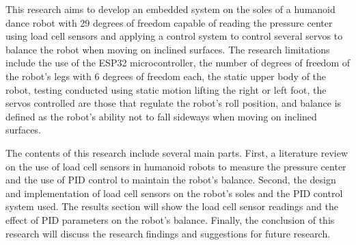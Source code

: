 This research aims to develop an embedded system on the soles of a humanoid dance robot with 29 degrees of freedom capable of reading the pressure center using load cell sensors and applying a control system to control several servos to balance the robot when moving on inclined surfaces. The research limitations include the use of the ESP32 microcontroller, the number of degrees of freedom of the robot's legs with 6 degrees of freedom each, the static upper body of the robot, testing conducted using static motion lifting the right or left foot, the servos controlled are those that regulate the robot's roll position, and balance is defined as the robot's ability not to fall sideways when moving on inclined surfaces.

The contents of this research include several main parts. First, a literature review on the use of load cell sensors in humanoid robots to measure the pressure center and the use of PID control to maintain the robot's balance. Second, the design and implementation of load cell sensors on the robot's soles and the PID control system used. The results section will show the load cell sensor readings and the effect of PID parameters on the robot's balance. Finally, the conclusion of this research will discuss the research findings and suggestions for future research.